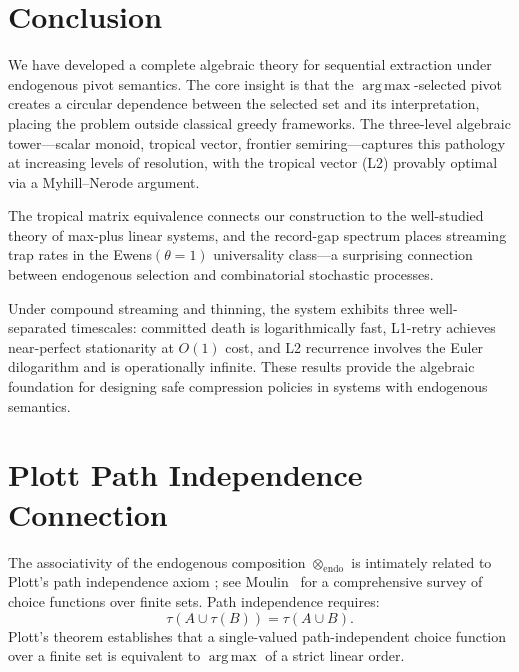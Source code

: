 \documentclass[11pt]{article}
\theoremstyle{plain}
\theoremstyle{definition}
\theoremstyle{remark}
\newcommand{\opendo}{\otimes_{\mathrm{endo}}}
\DeclareMathOperator*{\argmax}{arg\,max}
\begin{document}
\section{Conclusion}\label{sec:conclusion}

We have developed a complete algebraic theory for sequential extraction
under endogenous pivot semantics.  The core insight is that the
$\argmax$-selected pivot creates a circular dependence between the
selected set and its interpretation, placing the problem outside
classical greedy frameworks.  The three-level algebraic tower---scalar
monoid, tropical vector, frontier semiring---captures this pathology at
increasing levels of resolution, with the tropical vector (L2)
provably optimal via a Myhill--Nerode argument.

The tropical matrix equivalence connects our construction to the
well-studied theory of max-plus linear systems, and the record-gap
spectrum places streaming trap rates in the Ewens$(\theta=1)$
universality class---a surprising connection between endogenous
selection and combinatorial stochastic processes.

Under compound streaming and thinning, the system exhibits three
well-separated timescales: committed death is logarithmically fast,
L1-retry achieves near-perfect stationarity at $O(1)$ cost, and L2
recurrence involves the Euler dilogarithm and is operationally
infinite.  These results provide the algebraic foundation for designing
safe compression policies in systems with endogenous semantics.




\appendix

\section{Plott Path Independence Connection}
\label{app:plott}

The associativity of the endogenous composition $\opendo$ is intimately
related to Plott's path independence axiom \cite{plott1973path}; see
Moulin~\cite{moulin1985choice} for a comprehensive survey of choice
functions over finite sets.  Path independence requires:
\[
  \tau(A \cup \tau(B)) = \tau(A \cup B).
\]
Plott's theorem establishes that a single-valued path-independent choice
function over a finite set is equivalent to $\argmax$ of a strict linear
order.
\end{document}
